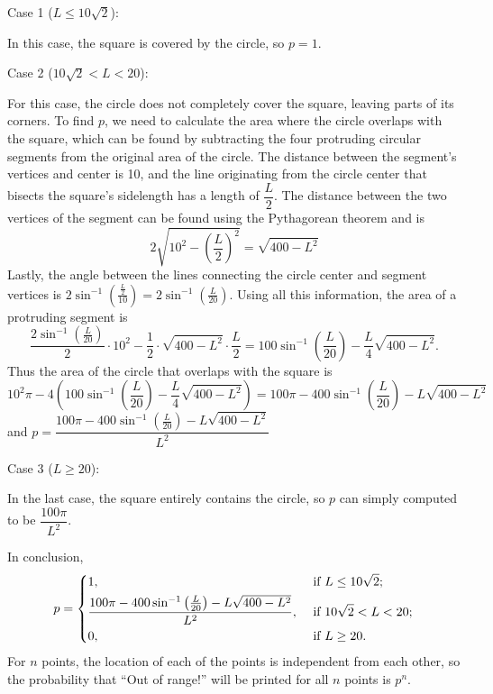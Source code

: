 \documentclass{assignment-263}
\begin{document}
\begin{enumerate}
\begin{enumerate}
    \smallskip

    Case 1 (\(L \leq 10\sqrt{2}\)):

    In this case, the square is covered by the circle, so \(p = 1\).

    \smallskip

    Case 2 (\(10\sqrt{2} < L < 20\)):

    For this case, the circle does not completely cover the square, leaving parts of its corners. To find \(p\), we need to calculate the area where the circle overlaps with the square, which can be found by subtracting the four protruding circular segments from the original area of the circle. The distance between the segment's vertices and center is 10, and the line originating from the circle center that bisects the square's sidelength has a length of \(\dfrac{L}{2}\). The distance between the two vertices of the segment can be found using the Pythagorean theorem and is
    \[
      2\sqrt{10^2 - \left( \frac{L}{2} \right)^2} = \sqrt{400 - L^2}
    \]
    Lastly, the angle between the lines connecting the circle center and segment vertices is \(2\sin ^{-1}\left( \frac{\frac{L}{2}}{10} \right) = 2\sin^{-1} \left( \frac{L}{20} \right)\). Using all this information, the area of a protruding segment is
    \[
      \frac{2\sin^{-1}\left( \frac{L}{20} \right)}{2}\cdot 10^2 - \frac{1}{2} \cdot \sqrt{400 - L^2} \cdot \frac{L}{2} = 100\sin^{-1} \left( \frac{L}{20} \right) - \frac{L}{4}\sqrt{400 - L^2}.
    \]
    Thus the area of the circle that overlaps with the square is
    \[
      10^2 \pi - 4\left( 100\sin^{-1} \left( \frac{L}{20} \right) - \frac{L}{4}\sqrt{400 - L^2} \right) = 100\pi - 400\sin^{-1}\left( \frac{L}{20} \right) - L\sqrt{400 - L^2}
    \]
    and \(p = \dfrac{100\pi - 400\sin^{-1}\left( \frac{L}{20} \right) - L\sqrt{400 - L^2}}{L^2}\) 

    \smallskip

    Case 3 (\(L \geq 20\)):

    In the last case, the square entirely contains the circle, so \(p\) can simply computed to be \(\dfrac{100\pi}{L^2}\).

    In conclusion,
    \[
      p = \begin{dcases}
        1, &\text{ if } L \leq 10\sqrt{2} ;\\
        \dfrac{100\pi - 400\sin^{-1}\left( \frac{L}{20} \right) - L\sqrt{400 - L^2}}{L^2}, &\text{ if } 10\sqrt{2} < L < 20 ;\\
        0, &\text{ if } L \geq 20.
      \end{dcases}
    \]
    For \(n\) points, the location of each of the points is independent from each other, so the probability that ``Out of range!'' will be printed for all \(n\) points is \(p^n\).
    

\end{enumerate}
\end{enumerate}
\end{document}

